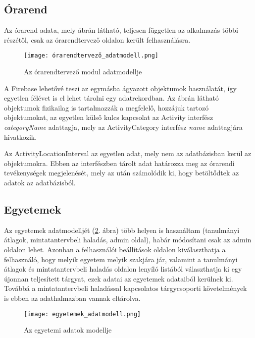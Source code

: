 \documentclass[a4paper,12pt]{report}
\begin{document}
\subsection{Órarend}

Az órarend adata, mely  ábrán látható, teljesen független az alkalmazás többi részétől, csak az órarendtervező oldalon került felhasználásra.

\begin{figure}[h]
    \centering
    \texttt{[image: órarendtervező\_adatmodell.png]}
    \caption{Az órarendtervező modul adatmodellje}
    \label{fig:data_model_timetable}
\end{figure}

A Firebase lehetővé teszi az egymásba ágyazott objektumok használatát, így egyetlen félévet is el lehet tárolni egy adatrekordban. Az ábrán látható objektumok fizikailag is tartalmazzák a megfelelő, hozzájuk tartozó objektumokat, az egyetlen külső kulcs kapcsolat az Activity interfész \textit{categoryName} adattagja, mely az ActivityCategory interfész \textit{name} adattagjára hivatkozik.

Az ActivityLocationInterval az egyetlen adat, mely nem az adatbázisban kerül az objektumokra. Ebben az interfészben tárolt adat határozza meg az órarendi tevékenységek megjelenését, mely az után számolódik ki, hogy betöltődtek az adatok az adatbázisból.

\subsection{Egyetemek}

Az egyetemek adatmodelljét (\ref{fig:data_model_universities}. ábra) több helyen is használtam (tanulmányi átlagok, mintatantervbeli haladás, admin oldal), habár módosítani csak az admin oldalon lehet. Azonban a felhasználói beállítások oldalon kiválaszthatja a felhasználó, hogy melyik egyetem melyik szakjára jár, valamint a tanulmányi átlagok és mintatantervbeli haladás oldalon lenyíló listából választhatja ki egy újonnan teljesített tárgyat, ezek adatai az egyetemek adataiból kerülnek ki. Továbbá a mintatantervbeli haladással kapcsolatos tárgycsoporti követelmények is ebben az adathalmazban vannak eltárolva.

\begin{figure}[h]
    \centering
    \texttt{[image: egyetemek\_adatmodell.png]}
    \caption{Az egyetemi adatok modellje}
    \label{fig:data_model_universities}
\end{figure}
\end{document}
